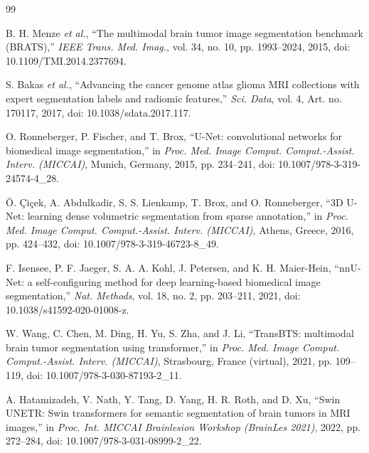 \clearpage
\renewcommand{\bibname}{References}

\begin{thebibliography}{99}
{}

\setlength{\itemsep}{6pt}
\setlength{\parskip}{0pt}

B. H. Menze \textit{et al.},
``The multimodal brain tumor image segmentation benchmark (BRATS),''
\textit{IEEE Trans. Med. Imag.}, vol. 34, no. 10, pp. 1993--2024, 2015, doi: 10.1109/TMI.2014.2377694.

S. Bakas \textit{et al.},
``Advancing the cancer genome atlas glioma MRI collections with expert segmentation labels and radiomic features,''
\textit{Sci. Data}, vol. 4, Art. no. 170117, 2017, doi: 10.1038/sdata.2017.117.

O. Ronneberger, P. Fischer, and T. Brox,
``U-Net: convolutional networks for biomedical image segmentation,''
in \textit{Proc. Med. Image Comput. Comput.-Assist. Interv. (MICCAI)},
Munich, Germany, 2015, pp. 234--241, doi: 10.1007/978-3-319-24574-4\_28.

\"{O}. \c{C}i\c{c}ek, A. Abdulkadir, S. S. Lienkamp, T. Brox, and O. Ronneberger,
``3D U-Net: learning dense volumetric segmentation from sparse annotation,''
in \textit{Proc. Med. Image Comput. Comput.-Assist. Interv. (MICCAI)},
Athens, Greece, 2016, pp. 424--432, doi: 10.1007/978-3-319-46723-8\_49.

F. Isensee, P. F. Jaeger, S. A. A. Kohl, J. Petersen, and K. H. Maier-Hein,
``nnU-Net: a self-configuring method for deep learning-based biomedical image segmentation,''
\textit{Nat. Methods}, vol. 18, no. 2, pp. 203--211, 2021, doi: 10.1038/s41592-020-01008-z.

W. Wang, C. Chen, M. Ding, H. Yu, S. Zha, and J. Li,
``TransBTS: multimodal brain tumor segmentation using transformer,''
in \textit{Proc. Med. Image Comput. Comput.-Assist. Interv. (MICCAI)},
Strasbourg, France (virtual), 2021, pp. 109--119, doi: 10.1007/978-3-030-87193-2\_11.

A. Hatamizadeh, V. Nath, Y. Tang, D. Yang, H. R. Roth, and D. Xu,
``Swin UNETR: Swin transformers for semantic segmentation of brain tumors in MRI images,''
in \textit{Proc. Int. MICCAI Brainlesion Workshop (BrainLes 2021)},
2022, pp. 272--284, doi: 10.1007/978-3-031-08999-2\_22.


\end{thebibliography}
